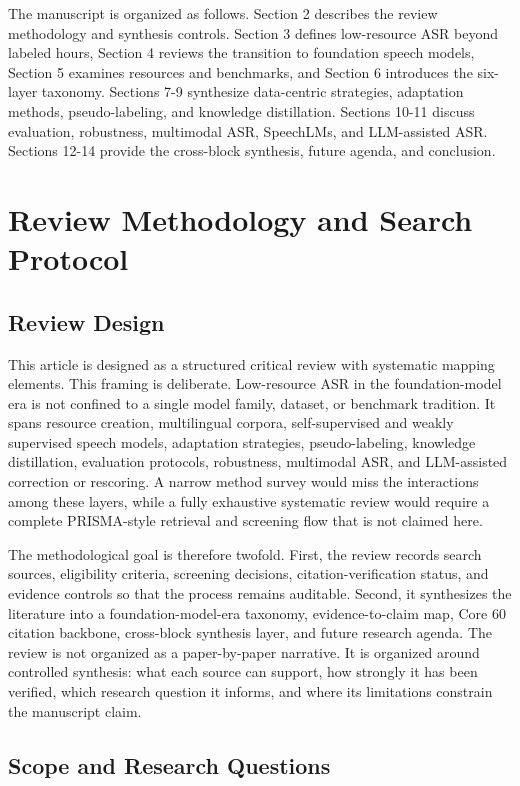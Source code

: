 \documentclass[pdflatex,sn-basic,iicol]{sn-jnl}
\theoremstyle{thmstyleone}
\theoremstyle{thmstyletwo}
\theoremstyle{thmstylethree}
\begin{document}
The manuscript is organized as follows. Section 2 describes the review methodology and synthesis controls. Section 3 defines low-resource ASR beyond labeled hours, Section 4 reviews the transition to foundation speech models, Section 5 examines resources and benchmarks, and Section 6 introduces the six-layer taxonomy. Sections 7-9 synthesize data-centric strategies, adaptation methods, pseudo-labeling, and knowledge distillation. Sections 10-11 discuss evaluation, robustness, multimodal ASR, SpeechLMs, and LLM-assisted ASR. Sections 12-14 provide the cross-block synthesis, future agenda, and conclusion.

\section{Review Methodology and Search Protocol}

\subsection{Review Design}

This article is designed as a structured critical review with systematic mapping elements. This framing is deliberate. Low-resource ASR in the foundation-model era is not confined to a single model family, dataset, or benchmark tradition. It spans resource creation, multilingual corpora, self-supervised and weakly supervised speech models, adaptation strategies, pseudo-labeling, knowledge distillation, evaluation protocols, robustness, multimodal ASR, and LLM-assisted correction or rescoring. A narrow method survey would miss the interactions among these layers, while a fully exhaustive systematic review would require a complete PRISMA-style retrieval and screening flow that is not claimed here.

The methodological goal is therefore twofold. First, the review records search sources, eligibility criteria, screening decisions, citation-verification status, and evidence controls so that the process remains auditable. Second, it synthesizes the literature into a foundation-model-era taxonomy, evidence-to-claim map, Core 60 citation backbone, cross-block synthesis layer, and future research agenda. The review is not organized as a paper-by-paper narrative. It is organized around controlled synthesis: what each source can support, how strongly it has been verified, which research question it informs, and where its limitations constrain the manuscript claim.

\subsection{Scope and Research Questions}
\end{document}
